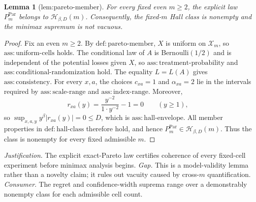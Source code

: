 \documentclass{article}
\newtheorem{lemma}{Lemma}
\begin{document}
\begin{lemma}[lem:pareto-member]\label{lem:pareto-member}
For every fixed even \(m\ge2\), the explicit law \(P_m^{\mathrm{Par}}\) belongs to \(\mathcal H_{\beta,D}(m)\). Consequently, the fixed-\(m\) Hall class is nonempty and the minimax supremum is not vacuous.
\end{lemma}
\begin{proof}
Fix an even \(m\geq 2\).  By \(\mathrm{def{:}pareto\text{-}member}\), \(X\) is uniform on \(\mathcal X_m\), so \(\mathrm{ass{:}uniform\text{-}cells}\) holds.  The conditional law of \(A\) is Bernoulli\((1/2)\) and is independent of the potential losses given \(X\), so \(\mathrm{ass{:}treatment\text{-}probability}\) and \(\mathrm{ass{:}conditional\text{-}randomization}\) hold.  The equality \(L=L(A)\) gives \(\mathrm{ass{:}consistency}\).  For every \(x,a\), the choices \(c_{xa}=1\) and \(\alpha_{xa}=2\) lie in the intervals required by \(\mathrm{ass{:}scale\text{-}range}\) and \(\mathrm{ass{:}index\text{-}range}\).  Moreover,
\[
r_{xa}(y)=\frac{y^{-2}}{1\cdot y^{-2}}-1=0
\qquad (y\geq 1),
\]
so \(\sup_{x,a,y}y^\beta|r_{xa}(y)|=0\leq D\), which is \(\mathrm{ass{:}hall\text{-}envelope}\).  All member properties in \(\mathrm{def{:}hall\text{-}class}\) therefore hold, and hence \(P_m^{\mathrm{Par}}\in\mathcal H_{\beta,D}(m)\).  Thus the class is nonempty for every fixed admissible \(m\).
\end{proof}
\par\smallskip\noindent \textit{Justification.} The explicit exact-Pareto law certifies coherence of every fixed-cell experiment before minimax analysis begins. \textit{Gap.} This is a model-validity lemma rather than a novelty claim; it rules out vacuity caused by cross-\(m\) quantification. \textit{Consumer.} The regret and confidence-width suprema range over a demonstrably nonempty class for each admissible cell count.
\end{document}
